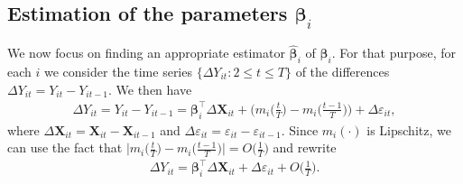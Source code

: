 \documentclass[a4paper,12pt]{article}
\begin{document}

\subsection{Estimation of the parameters $\bm{\beta}_i$}\label{subsec:beta_est}

We now focus on finding an appropriate estimator $\widehat{\bm{\beta}}_i$ of $\bm{\beta}_i$. For that purpose, for each $i$ we consider the time series $\{\Delta Y_{it}: 2 \leq t \leq T\}$ of the differences $\Delta Y_{it} = Y_{it} - Y_{i t-1}$. We then have
\begin{align*}
	\Delta Y_{it} = Y_{it} - Y_{i t-1} =\bm{\beta}_i^\top \Delta \mathbf{X}_{it} + \bigg(m_i \Big( \frac{t}{T} \Big) - m_i \Big(\frac{t-1}{T}\Big)\bigg) + \Delta \varepsilon_{it},
\end{align*}
where $\Delta  \mathbf{X}_{it} =  \mathbf{X}_{it} -  \mathbf{X}_{it-1}$ and $ \Delta \varepsilon_{it} = \varepsilon_{it} - \varepsilon_{i t-1}$. Since $m_i(\cdot)$ is Lipschitz, we can use the fact that $ \big|m_i \big( \frac{t}{T} \big) - m_i \big(\frac{t-1}{T}\big) \big| = O\big(\frac{1}{T}\big)$ and rewrite 
\begin{align}\label{model_with_regs}
	\Delta Y_{it} = \bm{\beta}_i^\top \Delta \mathbf{X}_{it} + \Delta \varepsilon_{it} + O\Big(\frac{1}{T}\Big).
\end{align}
\end{document}

